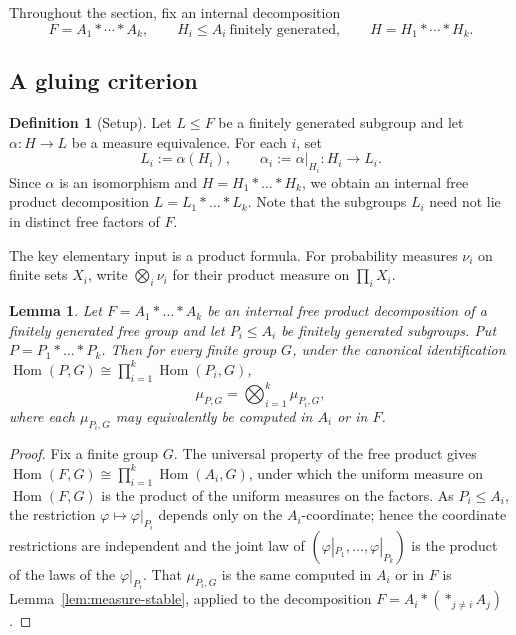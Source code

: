\documentclass[11pt]{amsart}
\theoremstyle{plain}
\newtheorem{lemma}[theorem]{Lemma}
\theoremstyle{definition}
\newtheorem{definition}[theorem]{Definition}
\newcommand{\Hom}{\operatorname{Hom}}
\begin{document}
Throughout the section, fix an internal decomposition
\[
  F=A_1*\cdots*A_k,
  \qquad H_i\le A_i\ \text{finitely generated},
  \qquad H=H_1*\cdots*H_k.
\]

\subsection{A gluing criterion}\label{sec:gluing}

\begin{definition}[Setup]\label{def:setup}
Let $L\le F$ be a finitely generated subgroup and let $\alpha\colon H\to L$ be a
measure equivalence.  For each $i$, set
\[
  L_i:=\alpha(H_i),\qquad \alpha_i:=\alpha|_{H_i}\colon H_i\to L_i .
\]
Since $\alpha$ is an isomorphism and $H=H_1*\dots*H_k$, we obtain an internal
free product decomposition $L=L_1*\dots*L_k$.  Note that the subgroups $L_i$ need
not lie in distinct free factors of $F$.
\end{definition}

The key elementary input is a product formula. For probability measures
$\nu_i$ on finite sets $X_i$, write $\bigotimes_i\nu_i$ for their product
measure on $\prod_iX_i$.

\begin{lemma}\label{lem:product-measure}
Let $F=A_1*\dots*A_k$ be an internal free product decomposition of a finitely
generated free group and let $P_i\le A_i$ be finitely generated subgroups.  Put
$P=P_1*\dots*P_k$.  Then for every finite group $G$, under the canonical
identification $\Hom(P,G)\cong\prod_{i=1}^{k}\Hom(P_i,G)$,
\[
  \mu_{P,G}=\bigotimes_{i=1}^{k}\mu_{P_i,G},
\]
where each $\mu_{P_i,G}$ may equivalently be computed in $A_i$ or in $F$.
\end{lemma}

\begin{proof}
Fix a finite group $G$.  The universal property of the free product gives
$\Hom(F,G)\cong\prod_{i=1}^{k}\Hom(A_i,G)$, under which the uniform measure on
$\Hom(F,G)$ is the product of the uniform measures on the factors.  As
$P_i\le A_i$, the restriction $\varphi\mapsto\varphi|_{P_i}$ depends only on the
$A_i$-coordinate; hence the coordinate restrictions are independent and the joint
law of $(\varphi|_{P_1},\dots,\varphi|_{P_k})$ is the product of the laws of the
$\varphi|_{P_i}$.  That $\mu_{P_i,G}$ is the same computed in $A_i$ or in $F$ is
Lemma~\ref{lem:measure-stable}, applied to the decomposition
$F=A_i*(\ast_{j\neq i}A_j)$.
\end{proof}
\end{document}
